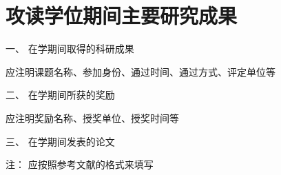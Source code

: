 
{}
\titlespacing{\chapter}{0pt}{-1em}{1em}
\chapter*{攻读学位期间主要研究成果}

\noindent
一、	在学期间取得的科研成果

应注明课题名称、参加身份、通过时间、通过方式、评定单位等

\noindent
二、	在学期间所获的奖励

应注明奖励名称、授奖单位、授奖时间等

\noindent
三、	在学期间发表的论文

注： 应按照参考文献的格式来填写
